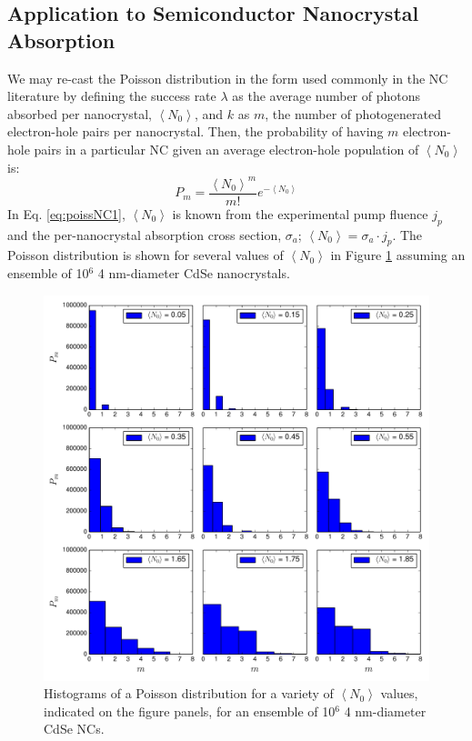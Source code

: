 \subsection{Application to Semiconductor Nanocrystal Absorption}
We may re-cast the Poisson distribution in the form used commonly in the NC literature by defining the success rate $\lambda$ as the average number of photons absorbed per nanocrystal, $\left\langle N_0\right\rangle$, and $k$ as $m$, the number of photogenerated electron-hole pairs per nanocrystal. Then, the probability of having $m$ electron-hole pairs in a particular NC given an average electron-hole population of $\left\langle N_0\right\rangle$ is:
\begin{equation}\label{eq:poissNC1}
P_m = \frac{\left\langle N_0\right\rangle^m}{m!}e^{-\left\langle N_0\right\rangle}
\end{equation}
In Eq. \ref{eq:poissNC1}, $\left\langle N_0\right\rangle$ is known from the experimental pump fluence $j_p$ and the per-nanocrystal absorption cross section, $\sigma_a$; $\left\langle N_0\right\rangle = \sigma_a \cdot j_p$. The Poisson distribution is shown for several values of $\left\langle N_0\right\rangle$ in Figure \ref{f:poisson1} assuming an ensemble of 10$^6$ 4 nm-diameter CdSe nanocrystals.

\begin{figure}
\begin{center}
\includegraphics[width=\textwidth]{./appendixA/poisson1.pdf}
\caption[Poisson distribution for nanocrystal exciton populations for various simulated pump fluences.]{Histograms of a Poisson distribution for a variety of $\left\langle N_0\right\rangle$ values, indicated on the figure panels, for an ensemble of 10$^6$ 4 nm-diameter CdSe NCs.}
\label{f:poisson1}
\end{center}
\end{figure}

